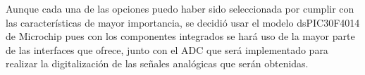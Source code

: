 Aunque cada una de las opciones puedo haber sido seleccionada por cumplir con las características de mayor importancia, se decidió usar el modelo dsPIC30F4014 de Microchip pues con los componentes integrados se hará uso de la mayor parte de las interfaces que ofrece, junto con el ADC que será implementado para realizar la digitalización de las señales analógicas que serán obtenidas.
